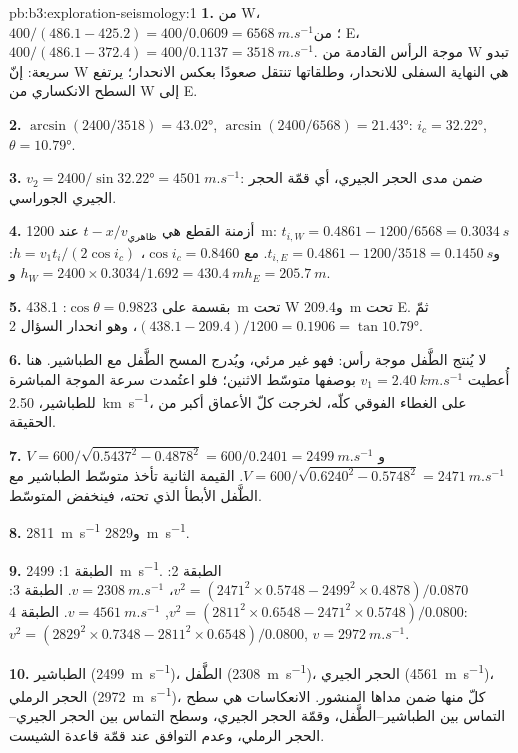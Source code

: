 \begin{solution}{pb:b3:exploration-seismology:1}
\textbf{1.} من W، $400/(486.1 - 425.2) = 400/0.0609 = \qty{6568}{m.s^{-1}}$؛
من E، $400/(486.1 - 372.4) = 400/0.1137 = \qty{3518}{m.s^{-1}}$. موجة الرأس
القادمة من W تبدو سريعة: إنّ W هي النهاية السفلى للانحدار، وطلقاتها تنتقل صعودًا بعكس الانحدار؛
يرتفع السطح الانكساري من W إلى E.

\textbf{2.} $\arcsin(2400/3518) = \ang{43.02}$, $\arcsin(2400/6568) =
\ang{21.43}$: $i_c = \ang{32.22}$, $\theta = \ang{10.79}$.

\textbf{3.} $v_2 = 2400/\sin\ang{32.22} = \qty{4501}{m.s^{-1}}$: ضمن
مدى الحجر الجيري، أي قمّة الحجر الجيري الجوراسي.

\textbf{4.} أزمنة القطع هي $t - x/v_{\text{ظاهري}}$ عند \qty{1200}{m}:
$t_{i,W} = 0.4861 - 1200/6568 = \qty{0.3034}{s}$ و$t_{i,E} = 0.4861 -
1200/3518 = \qty{0.1450}{s}$. مع $\cos i_c = 0.8460$، $h = v_1t_i/(2\cos
i_c)$: $h_W = 2400\times0.3034/1.692 = \qty{430.4}{m}$ و$h_E =
\qty{205.7}{m}$.

\textbf{5.} بقسمة على $\cos\theta = 0.9823$: \qty{438.1}{m} تحت W
و\qty{209.4}{m} تحت E. ثمّ $(438.1 - 209.4)/1200 = 0.1906 =
\tan\ang{10.79}$، وهو انحدار السؤال 2.

\textbf{6.} لا يُنتج الطَّفل موجة رأس: فهو غير مرئي، ويُدرج المسح
الطَّفل مع الطباشير. هنا أُعطيت $v_1 = \qty{2.40}{km.s^{-1}}$ بوصفها
متوسّط الاثنين؛ فلو اعتُمدت سرعة الموجة المباشرة للطباشير، \qty{2.50}{km.s^{-1}}،
على الغطاء الفوقي كلّه، لخرجت كلّ الأعماق أكبر من الحقيقة.

\textbf{7.} $V = 600/\sqrt{0.5437^2 - 0.4878^2} = 600/0.2401 =
\qty{2499}{m.s^{-1}}$ و$V = 600/\sqrt{0.6240^2 - 0.5748^2} =
\qty{2471}{m.s^{-1}}$. القيمة الثانية تأخذ متوسّط الطباشير مع الطَّفل الأبطأ
الذي تحته، فينخفض المتوسّط.

\textbf{8.} \qty{2811}{m.s^{-1}} و\qty{2829}{m.s^{-1}}.

\textbf{9.} الطبقة 1: \qty{2499}{m.s^{-1}}. الطبقة 2: $v^2 = (2471^2\times0.5748
- 2499^2\times0.4878)/0.0870$، $v = \qty{2308}{m.s^{-1}}$. الطبقة 3:
$v^2 = (2811^2\times0.6548 - 2471^2\times0.5748)/0.0800$,
$v = \qty{4561}{m.s^{-1}}$. الطبقة 4: $v^2 = (2829^2\times0.7348 -
2811^2\times0.6548)/0.0800$, $v = \qty{2972}{m.s^{-1}}$.

\textbf{10.} الطباشير (\qty{2499}{m.s^{-1}})، الطَّفل (\qty{2308}{m.s^{-1}})،
الحجر الجيري (\qty{4561}{m.s^{-1}})، الحجر الرملي (\qty{2972}{m.s^{-1}})، كلّ منها ضمن
مداها المنشور. الانعكاسات هي سطح التماس بين الطباشير--الطَّفل، وقمّة
الحجر الجيري، وسطح التماس بين الحجر الجيري--الحجر الرملي، وعدم التوافق عند
قمّة قاعدة الشيست.


\end{solution}

